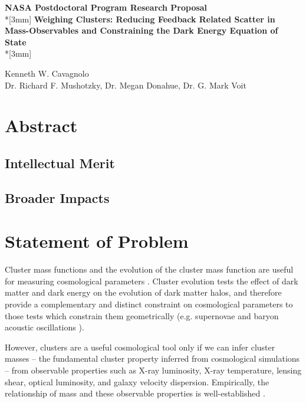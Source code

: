 \documentclass[12pt]{proposal}
\begin{document}
\begin{center}
{\Large{\bf NASA Postdoctoral Program Research Proposal}}\\*[3mm]
{\bf Weighing Clusters: Reducing Feedback Related Scatter in
Mass-Observables and Constraining the Dark Energy Equation of State} \\*[3mm]

Kenneth W. Cavagnolo \\
Dr. Richard F. Mushotzky, Dr. Megan Donahue, Dr. G. Mark Voit

\end{center}

\doublespacing

\section*{\large Abstract}

\subsection*{\normalsize Intellectual Merit}

\subsection*{\normalsize Broader Impacts}

\newpage

\section*{\large Statement of Problem}

Cluster mass functions and the evolution of the cluster mass function
are useful for measuring cosmological parameters
\citep{1989ApJ...341L..71E, 1998ApJ...508..483W, 2001ApJ...553..545H,
2003PhRvD..67h1304H, 2004PhRvD..70l3008W}. Cluster evolution tests the
effect of dark matter and dark energy on the evolution of dark matter
halos, and therefore provide a complementary and distinct constraint
on cosmological parameters to those tests which constrain
them geometrically (e.g. supernovae \citep{1998AJ....116.1009R,
2007ApJ...659...98R} and baryon acoustic oscillations
\citep{2005ApJ...633..560E}).

However, clusters are a useful cosmological tool only if we can infer
cluster masses -- the fundamental cluster property inferred from
cosmological simulations \citep{1990ApJ...363..349E} -- from
observable properties such as X-ray luminosity, X-ray temperature,
lensing shear, optical luminosity, and galaxy velocity
dispersion. Empirically, the relationship of mass and these observable
properties is well-established \citep{2005RvMP...77..207V}.
\end{document}
